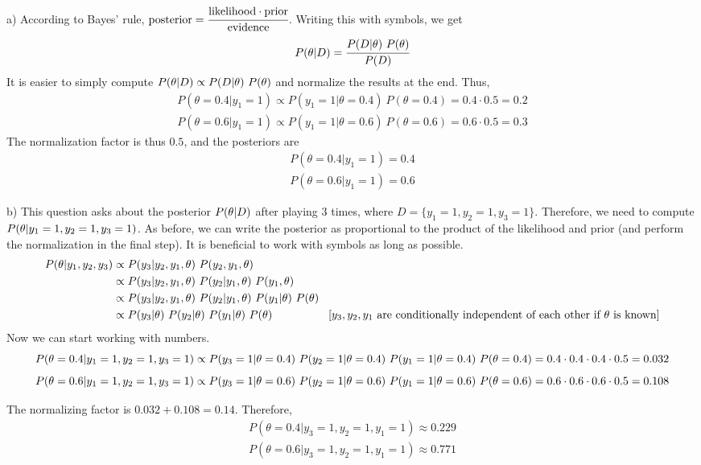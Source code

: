 \begin{solution}
	a) According to Bayes' rule, $\text{posterior} = \cfrac{\text{likelihood}\cdot\text{prior}}{\text{evidence}}$. Writing this with symbols, we get
	$$P(\theta | D) = \cfrac{P(D|\theta)~ P(\theta)}{P(D)}$$
It is easier to simply compute $P(\theta | D) \propto P(D|\theta)~ P(\theta)$ and normalize the results at the end. Thus,
	\begin{align*}
		P(\theta = 0.4 | y_1 = 1) \propto P(y_1 = 1 | \theta = 0.4)~ P(\theta=0.4) = 0.4 \cdot 0.5 = 0.2\\
		P(\theta = 0.6 | y_1 = 1) \propto P(y_1 = 1 | \theta = 0.6)~ P(\theta=0.6) = 0.6 \cdot 0.5 = 0.3
	\end{align*}
The normalization factor is thus $0.5$, and the posteriors are
	\begin{align*}
		P(\theta = 0.4 | y_1 = 1) = 0.4\\
		P(\theta = 0.6 | y_1 = 1) = 0.6
	\end{align*}
	
	b) This question asks about the posterior $P(\theta|D)$ after playing 3 times, where $D = \{ y_1=1, y_2=1, y_3=1 \}$. Therefore, we need to compute $P(\theta|y_1=1, y_2=1, y_3=1)$. As before, we can write the posterior as proportional to the product of the likelihood and prior (and perform the normalization in the final step). It is beneficial to work with symbols as long as possible.
	\begin{align*}
		P(\theta|y_1, y_2, y_3) &\propto P(y_3 | y_2, y_1, \theta)~ P(y_2, y_1, \theta) \\
		&\propto P(y_3 | y_2, y_1, \theta)~ P(y_2 | y_1, \theta)~ P(y_1, \theta) \\
		&\propto P(y_3 | y_2, y_1, \theta)~ P(y_2 | y_1, \theta)~ P(y_1 | \theta)~ P(\theta) \\
		&\propto P(y_3 | \theta)~ P(y_2 | \theta)~ P(y_1 | \theta)~ P(\theta) \hspace{50pt} \text{[$y_3, y_2, y_1$ are conditionally independent of each other if $\theta$ is known]}
	\end{align*}
Now we can start working with numbers.
$$P(\theta=0.4|y_1=1, y_2=1, y_3=1) \propto P(y_3=1 | \theta=0.4)~ P(y_2=1 | \theta=0.4)~ P(y_1=1 | \theta=0.4)~ P(\theta=0.4) = 0.4 \cdot 0.4 \cdot 0.4 \cdot 0.5 = 0.032$$
$$P(\theta=0.6|y_1=1, y_2=1, y_3=1) \propto P(y_3=1 | \theta=0.6)~ P(y_2=1 | \theta=0.6)~ P(y_1=1 | \theta=0.6)~ P(\theta=0.6) = 0.6 \cdot 0.6 \cdot 0.6 \cdot 0.5 = 0.108$$

The normalizing factor is $0.032 + 0.108 = 0.14$. Therefore,
	\begin{align*}
		P(\theta = 0.4| y_3=1, y_2=1, y_1=1) \approx 0.229\\
		P(\theta = 0.6| y_3=1, y_2=1, y_1=1) \approx 0.771
	\end{align*}
\end{solution}

